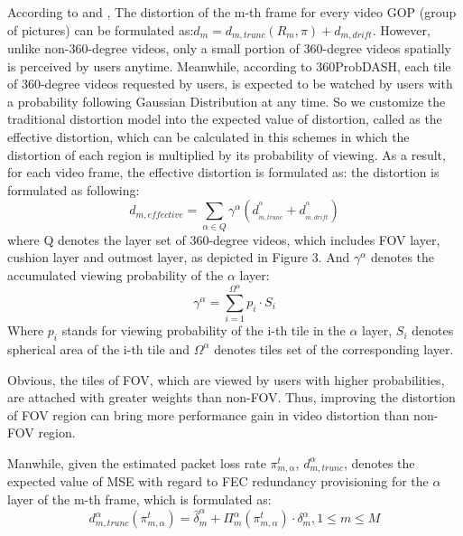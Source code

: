 According to \cite{distortion_model} and \cite{CMT-VR}, 
The distortion of the m-th frame for every video GOP (group of pictures) can be formulated as:${d_m} = d_{m,trunc}(R_m,\pi) + {d_{m,drift}}$.
However, unlike non-360-degree videos, only a small portion of 360-degree videos spatially is perceived by users anytime. Meanwhile, according to 360ProbDASH\cite{360ProbDASH}, each tile of 360-degree videos requested by users, is expected to be watched by users with a probability following Gaussian Distribution at any time. So we customize the traditional distortion model into the expected value of distortion, called as the effective distortion, which can be calculated in this schemes in which the distortion of each region is multiplied by its probability of viewing. As a result, for each video frame, the effective distortion is formulated as:
the distortion is formulated as following:\[{d_{m,effective}} = \sum\limits_{\alpha  \in Q} {{\gamma ^\alpha }(d_{_{m,trunc}}^{^\alpha } + d_{_{m,drift}}^{^\alpha })} \]
where Q denotes the layer set of 360-degree videos, which includes FOV layer, cushion layer and outmost layer, as depicted in Figure 3. And ${\gamma ^\alpha }$ denotes the accumulated viewing probability of the $\alpha $
layer:
\begin{equation}
{\gamma ^\alpha } = \sum\limits_{i = 1}^{{\Omega ^\alpha }} {{p_i} \cdot
	{S_i}}
\end{equation}
Where ${p_i}$ stands for viewing probability of the i-th tile in the $\alpha $
layer,   ${S_i}$ denotes spherical area of the i-th tile and
${\Omega ^\alpha }$ denotes tiles set of the corresponding layer. 

Obvious, the tiles of FOV, which are viewed by users with higher probabilities, are attached with greater weights than non-FOV. Thus, improving the distortion of FOV region can bring more performance gain in video distortion than non-FOV region. 

Manwhile, given the estimated packet loss rate $\pi _{m,\alpha }^t$,  $d_{m,trunc}^\alpha$, denotes the expected value of MSE with regard to FEC redundancy provisioning for the $\alpha$ layer of the m-th frame, which is
formulated as:
\[d_{m,trunc}^\alpha (\pi _{m,\alpha }^t) = \widehat \delta _m^\alpha  + \Pi _m^\alpha (\pi _{m,\alpha }^t)\cdot\delta _m^\alpha ,1 \le m \le M\]	



